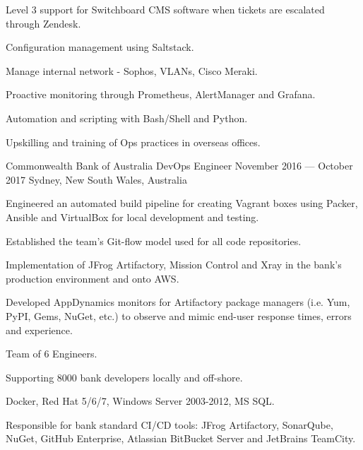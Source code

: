 \begin{experiences}
{\begin{cvitems}
      \item {Level 3 support for Switchboard CMS software when tickets are escalated through Zendesk.}
      \item {Configuration management using Saltstack.}
      \item {Manage internal network - Sophos, VLANs, Cisco Meraki.}
      \item {Proactive monitoring through Prometheus, AlertManager and Grafana.}
      \item {Automation and scripting with Bash/Shell and Python.}
      \item {Upskilling and training of Ops practices in overseas offices.}
    \end{cvitems}
  }

  \expitem
  {Commonwealth Bank of Australia} %
  {DevOps Engineer} %
  {November 2016 --- October 2017} %
  {Sydney, New South Wales, Australia} %
  {
    \begin{cvitems}
      \item {Engineered an automated build pipeline for creating Vagrant boxes using Packer, Ansible and VirtualBox for local development and testing.}
      \item {Established the team's Git-flow model used for all code repositories.}
      \item {Implementation of JFrog Artifactory, Mission Control and Xray in the bank's production environment and onto AWS.}
      \item {Developed AppDynamics monitors for Artifactory package managers (i.e. Yum, PyPI, Gems, NuGet, etc.) to observe and mimic end-user response times, errors and experience.}    \end{cvitems}
  }
  {
    \begin{cvitems}
      \item {Team of 6 Engineers.}
      \item {Supporting 8000 bank developers locally and off-shore.}
      \item {Docker, Red Hat 5/6/7, Windows Server 2003-2012, MS SQL.}
    \end{cvitems}
  }
  {
    \begin{cvitems}
      \item {Responsible for bank standard CI/CD tools: JFrog Artifactory, SonarQube, NuGet, GitHub Enterprise, Atlassian BitBucket Server and JetBrains TeamCity.}

\end{cvitems}}
\end{experiences}
